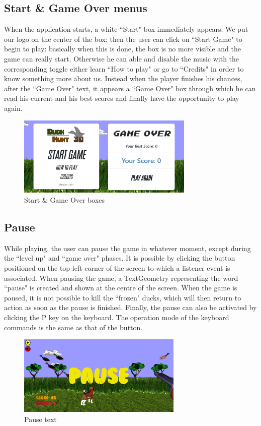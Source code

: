 \documentclass[12pt,a4paper]{article}
\begin{document}
	\subsection{Start \& Game Over menus}
	When the application starts, a white ``Start" box immediately appears.
	We put our logo on the center of the box; then the user can click on 
	``Start Game" to begin to play: basically when this is done, the box 
	is no more visible and the game can really start. 
	Otherwise he can able and disable the music with the corresponding 
	toggle either learn ``How to play" or go to ``Credits" in order to 
	know something more about us.
	Instead when the player finishes his chances, after the ``Game Over" text, it appears a ``Game Over" box through which he can read his current and his best scores and finally have the opportunity to play again.
	\begin{figure}[hbt!]
		\centering
		\includegraphics[width=0.75\textwidth]{boxes}
		\caption{Start \& Game Over boxes}
		\label{fig5}
	\end{figure}
	\subsection{Pause}
	While playing, the user can pause the game in whatever moment, except 
	during the ``level up" and ``game over" phases.
	It is possible by clicking the button positioned on the top left 
	corner of the screen to which a listener event is associated.
	When pausing the game, a TextGeometry representing the word ``pause" 
	is created and shown at the centre of the screen.
	When the game is paused, it is not possible to kill the ``frozen" 
	ducks, which will then return to action as soon as the pause is 
	finished.
	Finally, the pause can also be activated by clicking the P key on 
	the keyboard. The operation mode of the keyboard commands is the 
	same as that of the button.
	\begin{figure}[hbt!]
		\centering
		\includegraphics[width=0.7\textwidth]{pause}
		\caption{Pause text}
		\label{fig6}
	\end{figure}
\end{document}
